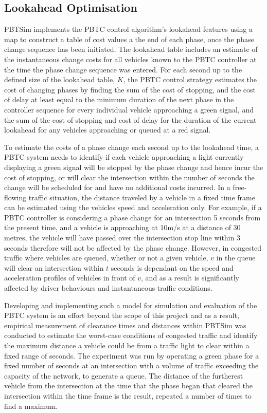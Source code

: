 \subsection{Lookahead Optimisation}

PBTSim implements the PBTC control algorithm's lookahead features using a map to construct a table of cost values a the end of each phase, once the phase change sequence has been initiated. The lookahead table includes an estimate of the instantaneous change costs for all vehicles known to the PBTC controller at the time the phase change sequence was entered. For each second up to the defined size of the lookahead table, $K$, the PBTC control strategy estimates the cost of changing phases by finding the sum of the cost of stopping, and the cost of delay at least equal to the minimum duration of the next phase in the controller sequence for every individual vehicle approaching a green signal, and the sum of the cost of stopping and cost of delay for the duration of the current lookahead for any vehicles approaching or queued at a red signal. 

To estimate the costs of a phase change each second up to the lookahead time, a PBTC system needs to identify if each vehicle approaching a light currently displaying a green signal will be stopped by the phase change and hence incur the cost of stopping, or will clear the intersection within the number of seconds the change will be scheduled for and have no additional costs incurred. In a free-flowing traffic situation, the distance traveled by a vehicle in a fixed time frame can be estimated using the vehicles speed and acceleration only. For example, if a PBTC controller is considering a phase change for an intersection 5 seconds from the present time, and a vehicle is approaching at 10m/s at a distance of 30 metres, the vehicle will have passed over the intersection stop line within 3 seconds therefore will not be affected by the phase change.  However, in congested traffic where vehicles are queued, whether or not a given vehicle, $v$ in the queue will clear an intersection within $t$ seconds is dependant on the speed and acceleration profiles of vehicles in front of $v$, and as a result is significantly affected by driver behaviours and instantaneous traffic conditions. 

Developing and implementing such a model for simulation and evaluation of the PBTC system is an effort beyond the scope of this project and as a result, empirical measurement of clearance times and distances within PBTSim was conducted to estimate the worst-case conditions of congested traffic and identify the maximum distance a vehicle could be from a traffic light to clear within a fixed range of seconds. The experiment was run by operating a green phase for a fixed number of seconds at an intersection with a volume of traffic exceeding the capacity of the network, to generate a queue. The distance of the furtherest vehicle from the intersection at the time that the phase began that cleared the intersection within the time frame is the result, repeated a number of times to find a maximum. 

